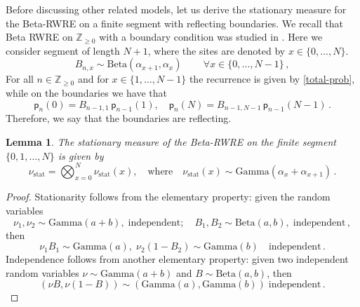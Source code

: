 \documentclass[a4paper,11pt,oneside,reqno]{amsart}
\newtheorem{lemma}[theorem]{Lemma}
\theoremstyle{definition}
\renewcommand{\geq}{\geqslant}
\numberwithin{equation}{section}
\begin{document}
Before discussing other related models, let us derive the stationary measure for the Beta-RWRE on a finite segment with reflecting boundaries. We recall that Beta RWRE on $\mathbb{Z}_{\geq 0}$ with a boundary condition was studied in \cite{barraquand2022}. Here we consider segment of length $N+1$, where the sites are denoted by $x\in \{0,\ldots,N\}$. 
   \begin{equation}\label{inhomogeneous-environment}
	B_{n,x}\sim \text{Beta}(\alpha_{x+1},\alpha_{x})\,\qquad \forall x\in \{0,\ldots, N-1\}\,,
\end{equation} 
For all $n\in\mathbb{Z}_{\geq 0}$ and for $x\in\{1,\ldots,N-1\} $ the recurrence is given by \eqref{total-prob}, while on the boundaries we have that 
    \begin{equation*}
		\mathsf{p}_{n}(0)=B_{n-1,1}\,\mathsf{p}_{n-1}(1),\quad 
		\mathsf{p}_{n}(N)=B_{n-1,N-1}\,\mathsf{p}_{n-1}(N-1)\,.
	\end{equation*} 
	Therefore, we say that the boundaries are reflecting.  
	\begin{lemma}\label{Lemma-stat-meas-RWRE-homo}
		The stationary measure of the Beta-RWRE on the finite segment $\{0,1,\ldots,N\}$ is given by 
		\begin{equation}\label{stationary-RWRE-non-Homo}
			\nu_{\text{stat}}=\bigotimes_{x=0}^{N}\nu_{\text{stat}}(x),\quad \text{where}\quad \nu_{\text{stat}}(x) \sim \mathrm{Gamma}(\alpha_{x}+\alpha_{x+1})\,.
		\end{equation} 
    \end{lemma}
\begin{proof} Stationarity follows from the elementary property: given the random variables
		\begin{equation*}
			\nu_{1},\nu_{2}\sim \text{Gamma}(a+b),\; \text{independent};\quad B_{1},B_{2}\sim \text{Beta}(a,b),\; \text{independent}\,,
		\end{equation*}
		then
		\begin{equation*}
			\nu_{1}B_{1}\sim \text{Gamma}(a),\;\nu_{2}(1-B_{2})\sim \text{Gamma}(b)\quad  \text{independent}\,.
		\end{equation*}  
Independence follows {\color{black}from} another elementary property: given two independent random variables $\nu\sim \text{Gamma}(a+b)$ and  $B\sim \text{Beta}(a,b)$, then  
\begin{equation*}
	(\nu B,\nu(1-B))\sim (\text{Gamma}(a),\text{Gamma}(b))\;\text{independent}\,.
\end{equation*}
\end{proof}
\end{document}
